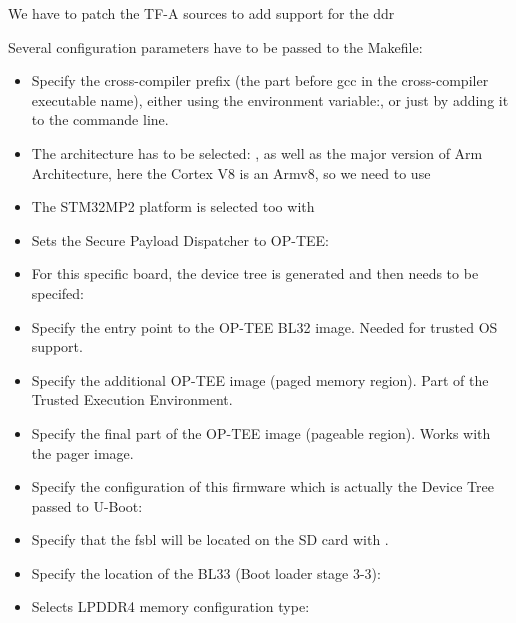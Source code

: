 We have to patch the TF-A sources to add support for the ddr
Several configuration parameters have to be passed to the Makefile:
\begin{itemize}
\item Specify the cross-compiler prefix (the part before gcc in the
      cross-compiler executable name), either using the environment
      variable:, or just by
      adding it to the  commande line.
\item The architecture has to be selected: , as
      well as the major version of Arm Architecture, here the Cortex V8 is
      an Armv8, so we need to use 
\item The STM32MP2 platform is selected too with 
\item Sets the Secure Payload Dispatcher to OP-TEE: 
\item For this specific board, the device tree is generated and then
      needs to be specifed: 
\item Specify the entry point to the OP-TEE BL32 image. Needed for trusted OS support.
\item Specify the additional OP-TEE image (paged memory region). Part of the Trusted Execution Environment.
\item Specify the final part of the OP-TEE image (pageable region). Works with the pager image.
\item Specify the configuration of this firmware which is actually
      the Device Tree passed to U-Boot:
\item Specify that the fsbl will be located on the SD
      card with .
\item Specify the location of the BL33 (Boot loader stage 3-3):
\item Selects LPDDR4 memory configuration type: 

\end{itemize}

